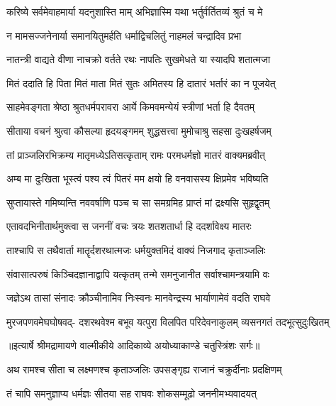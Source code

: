 \twolineshloka
{करिष्ये सर्वमेवाहमार्या यदनुशास्ति माम्}
{अभिज्ञास्मि यथा भर्तुर्वर्तितव्यं श्रुतं च मे} %

\twolineshloka
{न मामसज्जनेनार्या समानयितुमर्हति}
{धर्माद्विचलितुं नाहमलं चन्द्रादिव प्रभा} %

\twolineshloka
{नातन्त्री वाद्यते वीणा नाचक्रो वर्तते रथः}
{नापतिः सुखमेधते या स्यादपि शतात्मजा} %

\twolineshloka
{मितं ददाति हि पिता मितं माता मितं सुतः}
{अमितस्य हि दातारं भर्तारं का न पूजयेत्} %

\twolineshloka
{साहमेवङ्गता श्रेष्ठा श्रुतधर्मपरावरा}
{आर्ये किमवमन्येयं स्त्रीणां भर्ता हि दैवतम्} %

\twolineshloka
{सीताया वचनं श्रुत्वा कौसल्या हृदयङ्गमम्}
{शुद्धसत्त्वा मुमोचाश्रु सहसा दुःखहर्षजम्} %

\twolineshloka
{तां प्राञ्जलिरभिक्रम्य मातृमध्येऽतिसत्कृताम्}
{रामः परमधर्मज्ञो मातरं वाक्यमब्रवीत्} %

\twolineshloka
{अम्ब मा दुःखिता भूस्त्वं पश्य त्वं पितरं मम}
{क्षयो हि वनवासस्य क्षिप्रमेव भविष्यति} %

\twolineshloka
{सुप्तायास्ते गमिष्यन्ति नववर्षाणि पञ्च च}
{सा समग्रमिह प्राप्तं मां द्रक्ष्यसि सुहृद्वृतम्} %

\twolineshloka
{एतावदभिनीतार्थमुक्त्वा स जननीं वचः}
{त्रयः शतशतार्धा हि ददर्शावेक्ष्य मातरः} %

\twolineshloka
{ताश्चापि स तथैवार्ता मातॄर्दशरथात्मजः}
{धर्मयुक्तमिदं वाक्यं निजगाद कृताञ्जलिः} %

\twolineshloka
{संवासात्परुषं किञ्चिदज्ञानाद्वापि यत्कृतम्}
{तन्मे समनुजानीत सर्वाश्चामन्त्रयामि वः} %

\twolineshloka
{जज्ञेऽथ तासां संनादः क्रौञ्चीनामिव निःस्वनः}
{मानवेन्द्रस्य भार्याणामेवं वदति राघवे} %

\fourlineindentedshloka
{मुरजपणवमेघघोषवद्-}
{दशरथवेश्म बभूव यत्पुरा}
{विलपित परिदेवनाकुलम्}
{व्यसनगतं तदभूत्सुदुःखितम्} %


{॥इत्यार्षे श्रीमद्रामायणे वाल्मीकीये आदिकाव्ये अयोध्याकाण्डे चतुस्त्रिंशः सर्गः॥}


\twolineshloka
{अथ रामश्च सीता च लक्ष्मणश्च कृताञ्जलिः}
{उपसङ्गृह्य राजानं चक्रुर्दीनाः प्रदक्षिणम्} %

\twolineshloka
{तं चापि समनुज्ञाप्य धर्मज्ञः सीतया सह}
{राघवः शोकसम्मूढो जननीमभ्यवादयत्} %

